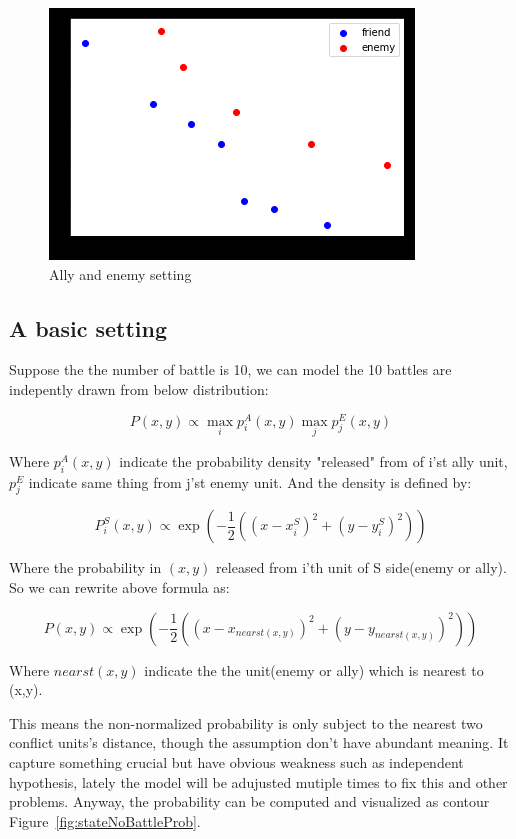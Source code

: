 \documentclass{article}
\begin{document}
\begin{figure}[h!]
\includegraphics{state_no_battle.png}
\caption{Ally and enemy setting}
\label{fig:stateNoBattle}
\end{figure}

\subsection{A basic setting}

Suppose the the number of battle is 10, we can model the 10 battles are indepently drawn from below 
distribution:

$$
P(x,y) \propto \max_i p^A_{i}(x,y) \max_j p^E_{j} (x,y)
$$

Where $p^A_{i}(x,y)$ indicate the probability density "released" from of i’st ally unit,
$p^E_{j}$ indicate same thing from j’st enemy unit. And the density is defined by:

$$
P^S_i(x,y) \propto \exp(-\frac{1}{2}((x-x^S_i)^2 + (y-y^S_i)^2))
$$

Where the probability in $(x,y)$ released from i'th unit of S side(enemy or ally). 
So we can rewrite above formula as: 

$$
P(x,y) \propto \exp(-\frac{1}{2}((x-x_{nearst(x,y)})^2 + (y-y_{nearst(x,y)})^2))
$$

Where $nearst(x,y)$ indicate the the unit(enemy or ally) which is nearest to (x,y).

This means the non-normalized probability is only subject to the nearest two conflict units’s distance, 
though the assumption don’t have abundant meaning. 
It capture something crucial but have obvious weakness such as independent hypothesis, lately the 
model will be adujusted mutiple times to fix this and other problems. Anyway, the probability
 can be computed and visualized as contour Figure~\ref{fig:stateNoBattleProb}.
\end{document}

